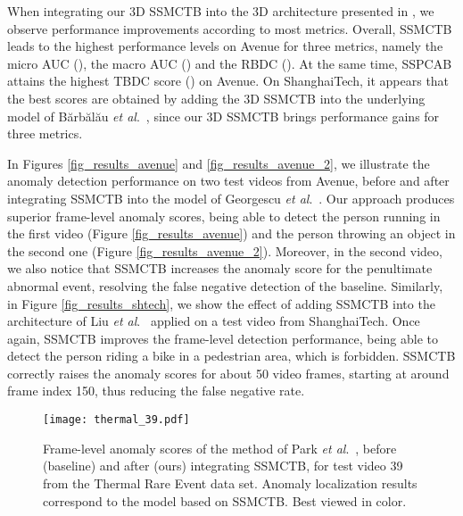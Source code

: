 \documentclass[10pt,journal,compsoc]{IEEEtran}
\newcommand{\etal}{\textit{et al}.}
\begin{document}
When integrating our 3D SSMCTB into the 3D architecture presented in \cite{Barbalau-ARXIV-2022}, we observe performance improvements according to most metrics. Overall, SSMCTB leads to the highest performance levels on Avenue for three metrics, namely the micro AUC (), the macro AUC () and the RBDC (). At the same time, SSPCAB attains the highest TBDC score () on Avenue. On ShanghaiTech, it appears that the best scores are obtained by adding the 3D SSMCTB into the underlying model of B\u{a}rb\u{a}l\u{a}u \etal~\cite{Barbalau-ARXIV-2022}, since our 3D SSMCTB brings performance gains for three metrics.

In Figures \ref{fig_results_avenue} and \ref{fig_results_avenue_2}, we illustrate the anomaly detection performance on two test videos from Avenue, before and after integrating SSMCTB into the model of Georgescu \etal~\cite{Georgescu-TPAMI-2021}. Our approach produces superior frame-level anomaly scores, being able to detect the person running in the first video (Figure \ref{fig_results_avenue}) and the person throwing an object in the second one (Figure \ref{fig_results_avenue_2}). Moreover, in the second video, we also notice that SSMCTB increases the anomaly score for the penultimate abnormal event, resolving the false negative detection of the baseline. Similarly, in Figure \ref{fig_results_shtech}, we show the effect of adding SSMCTB into the architecture of Liu \etal~\cite{Liu-ICCV-2021} applied on a test video from ShanghaiTech. Once again, SSMCTB improves the frame-level detection performance, being able to detect the person riding a bike in a pedestrian area, which is forbidden. SSMCTB correctly raises the anomaly scores for about 50 video frames, starting at around frame index 150, thus reducing the false negative rate. 

\begin{figure}[t]
\begin{center}
\centerline{\texttt{[image: thermal\_39.pdf]}}
\vspace{-0.2cm}
\caption{Frame-level anomaly scores of the method of Park \etal~\cite{Park-CVPR-2020}, before (baseline) and after (ours) integrating SSMCTB, for test video 39 from the Thermal Rare Event data set. Anomaly localization results correspond to the model based on SSMCTB. Best viewed in color.}
\label{fig_results_thermal}
\vspace{-0.2cm}
\end{center}
\end{figure}
\end{document}
